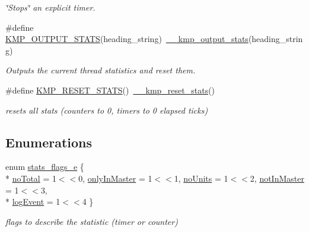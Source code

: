 \begin{DoxyCompactItemize}
\begin{DoxyCompactList}\small\item\em \char`\"{}\-Stops\char`\"{} an explicit timer. \end{DoxyCompactList}\item 
\#define \hyperlink{group__STATS__GATHERING_ga568b0fdabf6bf808dcb3b42b97c7bc26}{K\-M\-P\-\_\-\-O\-U\-T\-P\-U\-T\-\_\-\-S\-T\-A\-T\-S}(heading\-\_\-string)~\hyperlink{kmp__stats_8h_a362a5984fda04b70b0a6f91c7ed2b14a}{\-\_\-\-\_\-kmp\-\_\-output\-\_\-stats}(heading\-\_\-string)
\begin{DoxyCompactList}\small\item\em Outputs the current thread statistics and reset them. \end{DoxyCompactList}\item 
\#define \hyperlink{group__STATS__GATHERING_gaa30e2155ac435335965e2e615c1eaea5}{K\-M\-P\-\_\-\-R\-E\-S\-E\-T\-\_\-\-S\-T\-A\-T\-S}()~\hyperlink{kmp__stats_8h_a85312f129dd8fb3e3471780d096c3023}{\-\_\-\-\_\-kmp\-\_\-reset\-\_\-stats}()
\begin{DoxyCompactList}\small\item\em resets all stats (counters to 0, timers to 0 elapsed ticks) \end{DoxyCompactList}\end{DoxyCompactItemize}
\subsection*{Enumerations}
\begin{DoxyCompactItemize}
\item 
enum \hyperlink{group__STATS__GATHERING_ga438c2840cc2d516238ea3eb0f4c116b3}{stats\-\_\-flags\-\_\-e} \{ \\*
\hyperlink{group__STATS__GATHERING_gga438c2840cc2d516238ea3eb0f4c116b3ab0da7f248271bb150e59d37370c799b7}{no\-Total} = 1$<$$<$0, 
\hyperlink{group__STATS__GATHERING_gga438c2840cc2d516238ea3eb0f4c116b3ab1b2cd818808a4ee2cc1720286fbc51d}{only\-In\-Master} = 1$<$$<$1, 
\hyperlink{group__STATS__GATHERING_gga438c2840cc2d516238ea3eb0f4c116b3a1c30b5719af4df0bdc7206f20559c6dc}{no\-Units} = 1$<$$<$2, 
\hyperlink{group__STATS__GATHERING_gga438c2840cc2d516238ea3eb0f4c116b3a0939773e208cb608fe78bc80a4197523}{not\-In\-Master} = 1$<$$<$3, 
\\*
\hyperlink{group__STATS__GATHERING_gga438c2840cc2d516238ea3eb0f4c116b3a53d50e56126850e531164b0bb1848c5e}{log\-Event} = 1$<$$<$4
 \}
\begin{DoxyCompactList}\small\item\em flags to describe the statistic (timer or counter) \end{DoxyCompactList}\end{DoxyCompactItemize}


